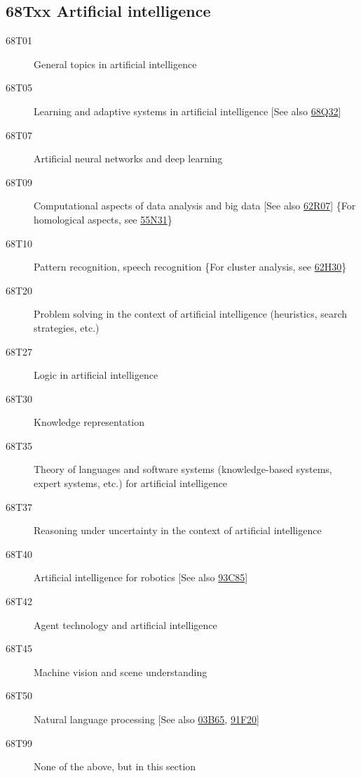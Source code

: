 \subsection*{68Txx  Artificial intelligence }\label{68Txx}
\begin{description}
\item [68T01]\label{68T01} General topics in artificial intelligence
\item [68T05]\label{68T05} Learning and adaptive systems in artificial intelligence [See also \hyperref[68Q32]{68Q32}]
\item [68T07]\label{68T07} Artificial neural networks and deep learning
\item [68T09]\label{68T09} Computational aspects of data analysis and big data [See also \hyperref[62R07]{62R07}] \{For homological aspects, see \hyperref[55N31]{55N31}\}
\item [68T10]\label{68T10} Pattern recognition, speech recognition \{For cluster analysis, see \hyperref[62H30]{62H30}\}
\item [68T20]\label{68T20} Problem solving in the context of artificial intelligence (heuristics, search strategies, etc.)
\item [68T27]\label{68T27} Logic in artificial intelligence
\item [68T30]\label{68T30} Knowledge representation
\item [68T35]\label{68T35} Theory of languages and software systems (knowledge-based systems, expert systems, etc.) for artificial intelligence
\item [68T37]\label{68T37} Reasoning under uncertainty in the context of artificial intelligence
\item [68T40]\label{68T40} Artificial intelligence for robotics [See also \hyperref[93C85]{93C85}]
\item [68T42]\label{68T42} Agent technology and artificial intelligence
\item [68T45]\label{68T45} Machine vision and scene understanding
\item [68T50]\label{68T50} Natural language processing [See also \hyperref[03B65]{03B65}, \hyperref[91F20]{91F20}]
\item [68T99]\label{68T99} None of the above, but in this section
\end{description}
